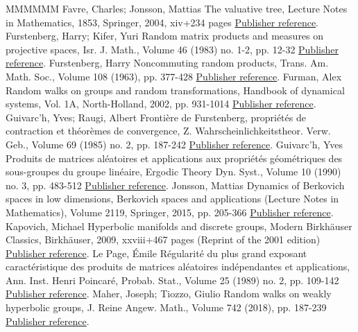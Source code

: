 \documentclass[11pt]{article}
\theoremstyle{definition}
\numberwithin{equation}{section}
\numberwithin{figure}{section}
\numberwithin{table}{section}
\begin{document}
\begin{thebibliography}{MMMMMM}
 Favre, Charles; Jonsson, Mattias The valuative tree, Lecture Notes in Mathematics, 1853, Springer, 2004, xiv+234 pages \href{https://ahl.centre-mersenne.org/item/AHL_2019__2__515_0/#valtree}{Publisher reference}.
 Furstenberg, Harry; Kifer, Yuri Random matrix products and measures on projective spaces, Isr. J. Math., Volume 46 (1983) no. 1-2, pp. 12-32 \href{https://ahl.centre-mersenne.org/item/AHL_2019__2__515_0/#furstenberg-kifer}{Publisher reference}.
 Furstenberg, Harry Noncommuting random products, Trans. Am. Math. Soc., Volume 108 (1963), pp. 377-428 \href{https://ahl.centre-mersenne.org/item/AHL_2019__2__515_0/#furstenberg}{Publisher reference}.
 Furman, Alex Random walks on groups and random transformations, Handbook of dynamical systems, Vol. 1A, North-Holland, 2002, pp. 931-1014 \href{https://ahl.centre-mersenne.org/item/AHL_2019__2__515_0/#furman}{Publisher reference}.
 Guivarc’h, Yves; Raugi, Albert Frontière de Furstenberg, propriétés de contraction et théorèmes de convergence, Z. Wahrscheinlichkeitstheor. Verw. Geb., Volume 69 (1985) no. 2, pp. 187-242 \href{https://ahl.centre-mersenne.org/item/AHL_2019__2__515_0/#guivarch-raugi}{Publisher reference}.
 Guivarc’h, Yves Produits de matrices aléatoires et applications aux propriétés géométriques des sous-groupes du groupe linéaire, Ergodic Theory Dyn. Syst., Volume 10 (1990) no. 3, pp. 483-512 \href{https://ahl.centre-mersenne.org/item/AHL_2019__2__515_0/#guivarch}{Publisher reference}.
 Jonsson, Mattias Dynamics of Berkovich spaces in low dimensions, Berkovich spaces and applications (Lecture Notes in Mathematics), Volume 2119, Springer, 2015, pp. 205-366 \href{https://ahl.centre-mersenne.org/item/AHL_2019__2__515_0/#jonsson}{Publisher reference}.
 Kapovich, Michael Hyperbolic manifolds and discrete groups, Modern Birkhäuser Classics, Birkhäuser, 2009, xxviii+467 pages (Reprint of the 2001 edition) \href{https://ahl.centre-mersenne.org/item/AHL_2019__2__515_0/#kapovich}{Publisher reference}.
 Le Page, Émile Régularité du plus grand exposant caractéristique des produits de matrices aléatoires indépendantes et applications, Ann. Inst. Henri Poincaré, Probab. Stat., Volume 25 (1989) no. 2, pp. 109-142 \href{https://ahl.centre-mersenne.org/item/AHL_2019__2__515_0/#lepage-holder}{Publisher reference}.
 Maher, Joseph; Tiozzo, Giulio Random walks on weakly hyperbolic groups, J. Reine Angew. Math., Volume 742 (2018), pp. 187-239 \href{https://ahl.centre-mersenne.org/item/AHL_2019__2__515_0/#maher-tiozzo}{Publisher reference}.

\end{thebibliography}
\end{document}
